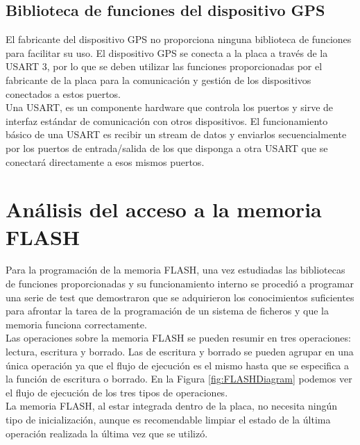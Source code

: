 \subsection{Biblioteca de funciones del dispositivo GPS} 
El fabricante del dispositivo GPS no proporciona ninguna biblioteca de funciones para facilitar su uso. El dispositivo GPS se conecta a la placa a través de la \acs{USART} 3, por lo que se deben utilizar las funciones proporcionadas por el fabricante de la placa para la comunicación y gestión de los dispositivos conectados a estos puertos. \\

Una \acs{USART}, es un componente hardware que controla los puertos y sirve de interfaz estándar de comunicación con otros dispositivos. El funcionamiento básico de una \acs{USART} es recibir un stream de datos y enviarlos secuencialmente por los puertos de entrada/salida de los que disponga a otra \acs{USART} que se conectará directamente a esos mismos puertos.\\

\section{Análisis del acceso a la memoria FLASH}
\label{obj3}
Para la programación de la memoria FLASH, una vez estudiadas las bibliotecas de funciones proporcionadas y su funcionamiento interno se procedió a programar una serie de test que demostraron que se adquirieron los conocimientos suficientes para afrontar la tarea de la programación de un sistema de ficheros y que la memoria funciona correctamente.\\

Las operaciones sobre la memoria FLASH se pueden resumir en tres operaciones: lectura, escritura y borrado. Las de escritura y borrado se pueden agrupar en una única operación ya que el flujo de ejecución es el mismo hasta que se especifica a la función de escritura o borrado. En la Figura \ref{fig:FLASHDiagram} podemos ver el flujo de ejecución de los tres tipos de operaciones.\\

La memoria FLASH, al estar integrada dentro de la placa, no necesita ningún tipo de inicialización, aunque es recomendable limpiar el estado de la última operación realizada la última vez que se utilizó.\\

